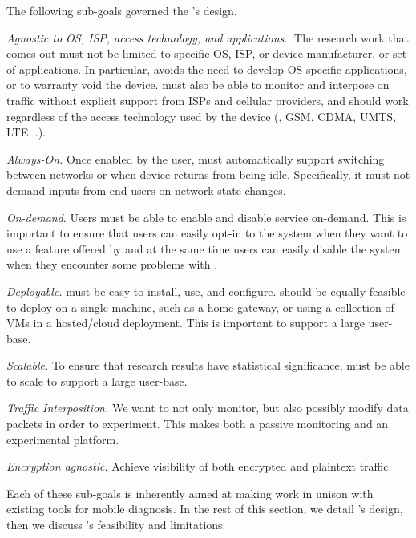 The following sub-goals governed the \meddle's design.
\begin{packedenumerate}
\item \emph{Agnostic to OS, ISP, access technology, and applications.}.
The research work that comes out must not be limited to specific OS, ISP, or device manufacturer, or set of applications.
In particular, \meddle avoids the need to develop OS-specific applications, or to warranty void the device. 
\meddle must also be able to monitor and interpose on traffic without explicit support from ISPs and cellular providers, and should work regardless of the access technology used by the device (\wifi, GSM, CDMA, UMTS, LTE, \etc.). 
\item \emph{Always-On.}
Once enabled by the user, \meddle must automatically support switching between networks or when device returns from being idle.
Specifically, it must not demand inputs from end-users on network state changes. 
\item \emph{On-demand}.
Users must be able to enable and disable service on-demand.
This is important to ensure that users can easily opt-in to the system when they want to use a feature offered by \meddle and at the same time users can easily disable the system when they encounter some problems with \meddle. 
\item \emph{Deployable.}
\meddle must be easy to install, use, and configure.
\meddle should be equally feasible to deploy on a single machine, such as a home-gateway, or using a collection of VMs in a hosted/cloud deployment. 
This is important to support a large user-base.
\item \emph{Scalable.}
To ensure that research results have statistical significance, \meddle must be able to scale to support a large user-base.
\item \emph{Traffic Interposition.} 
We want to not only monitor, but also possibly modify data packets in order to experiment. 
This makes \meddle both a passive monitoring and an experimental platform. 
\item \emph{Encryption agnostic.} 
Achieve visibility of both encrypted and plaintext traffic.
\end{packedenumerate} 
Each of these sub-goals is inherently aimed at making \meddle work in unison with existing tools for mobile diagnosis. 
In the rest of this section, we detail \meddle's design, then we discuss \meddle's feasibility and limitations.

